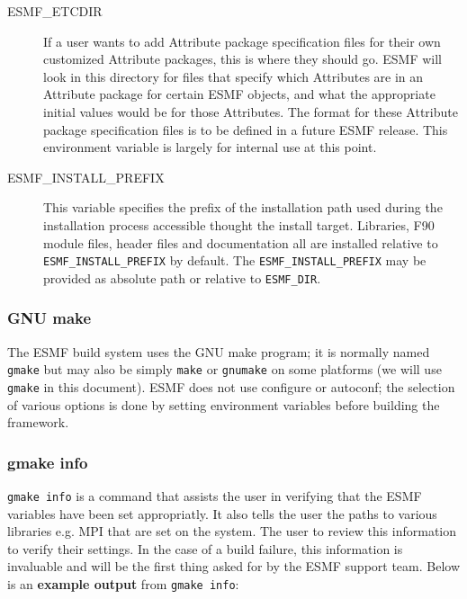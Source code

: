 \begin{description}
\item[ESMF\_ETCDIR]
If a user wants to add Attribute package specification files for their own 
customized Attribute packages, this is where they should go.  ESMF will look in 
this directory for files that specify which Attributes are in an Attribute 
package for certain ESMF objects, and what the appropriate initial values would 
be for those Attributes.  The format for these Attribute package specification 
files is to be defined in a future ESMF release.  This environment variable is 
largely for internal use at this point. 

\item[ESMF\_INSTALL\_PREFIX]
This variable specifies the prefix of the installation path used during the
installation process accessible thought the install target. Libraries, F90
module files, header files and documentation all are installed relative to
{\tt ESMF\_INSTALL\_PREFIX} by default. The {\tt ESMF\_INSTALL\_PREFIX} may be
provided as absolute path or relative to {\tt ESMF\_DIR}.

\end{description}


\subsubsection{GNU make}
The ESMF build system uses the GNU make program; it is normally named 
{\tt gmake} but may also be simply {\tt make} or {\tt gnumake} on some 
platforms (we will use {\tt gmake} in this document). ESMF does not use
configure or autoconf;  the selection of various options is done by
setting environment variables before building the framework. 


\subsubsection{gmake info}
{\tt gmake info} is a command that assists the user in verifying that the ESMF 
variables have been set appropriatly. It also tells the user the paths to 
various libraries e.g. MPI that are set on the system. The user to review 
this information to verify their settings. In the case of a build failure, 
this information is invaluable and will be the first thing asked for by the
ESMF support team. Below is an {\bf example output} from {\tt gmake info}: 
 

